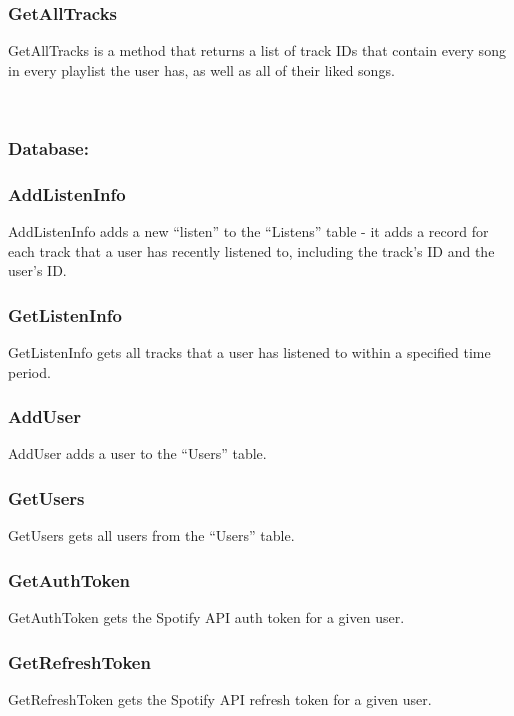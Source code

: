 \documentclass[10pt]{report}
\begin{document}
\subsubsection{GetAllTracks}
GetAllTracks is a method that returns a list of track IDs that contain every song in every playlist the user has, as well as all of their liked songs.

\leavevmode \\

\subsubsection{Database:}

\hrulefill

\subsubsection{AddListenInfo}
AddListenInfo adds a new “listen” to the “Listens” table - it adds a record for each track that a user has recently listened to, including the track’s ID and the user’s ID.

\subsubsection{GetListenInfo}
GetListenInfo gets all tracks that a user has listened to within a specified time period.

\subsubsection{AddUser}
AddUser adds a user to the “Users” table.

\subsubsection{GetUsers}
GetUsers gets all users from the “Users” table.

\subsubsection{GetAuthToken}
GetAuthToken gets the Spotify API auth token for a given user.

\subsubsection{GetRefreshToken}
GetRefreshToken gets the Spotify API refresh token for a given user.
\end{document}
